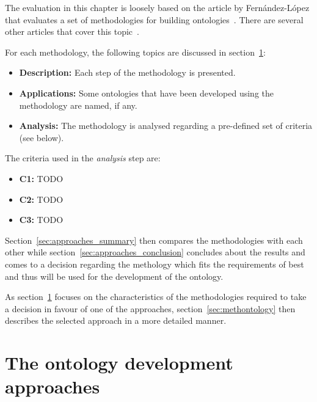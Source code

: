 The evaluation in this chapter is loosely based on the article by Fernández-López that evaluates a set of methodologies for building ontologies~\cite{MethodologyOverview}. There are several other articles that cover this topic~\cite{MethodologyComparison1,MethodologyComparison2,MethodologyComparison3}.

For each methodology, the following topics are discussed in section~\ref{sec:ontology_approaches}:

\begin{itemize}
  \item \textbf{Description:} Each step of the methodology is presented.
  
  \item \textbf{Applications:} Some ontologies that have been developed using the methodology are named, if any.
  
  \item \textbf{Analysis:} The methodology is analysed regarding a pre-defined set of criteria (see below).
\end{itemize}

The criteria used in the \emph{analysis} step are:

\begin{itemize}
  \item \textbf{C1:} TODO
  
  \item \textbf{C2:} TODO
  
  \item \textbf{C3:} TODO
\end{itemize}

Section~\ref{sec:approaches_summary} then compares the methodologies with each other while section~\ref{sec:approaches_conclusion} concludes about the results and comes to a decision regarding the methology which fits the requirements of \thinkhomeweather best and thus will be used for the development of the ontology.

As section~\ref{sec:ontology_approaches} focuses on the characteristics of the methodologies required to take a decision in favour of one of the approaches, section~\ref{sec:methontology} then describes the selected approach in a more detailed manner.

\section{The ontology development approaches}
\label{sec:ontology_approaches}

